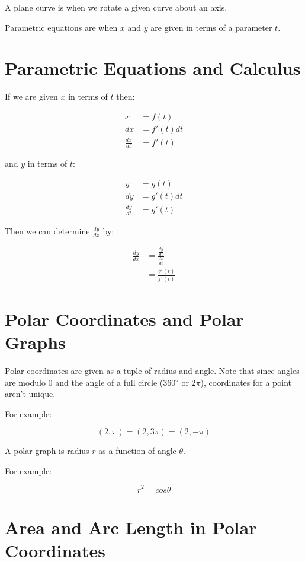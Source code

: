 \documentclass{article}
\begin{document}
A plane curve is when we rotate a given curve about an axis.

Parametric equations are when $x$ and $y$ are given in terms of a parameter $t$.

\section{Parametric Equations and Calculus}

If we are given $x$ in terms of $t$ then:

\begin{align*}
  x &= f(t) \\
  dx &= f'(t)dt \\
  \frac{dx}{dt} &= f'(t)
\end{align*}

and $y$ in terms of $t$:

\begin{align*}
  y &= g(t) \\
  dy &= g'(t)dt \\
  \frac{dy}{dt} &= g'(t)
\end{align*}

Then we can determine $\frac{dy}{dx}$ by:

\begin{align*}
  \frac{dy}{dx} &= \frac{ \frac{dy}{dt} }{ \frac{dx}{dt} } \\
  &= \frac{g'(t)}{f'(t)}
\end{align*}

\section{Polar Coordinates and Polar Graphs}

Polar coordinates are given as a tuple of radius and angle.  Note that
since angles are modulo 0 and the angle of a full circle ($360^o$ or
$2\pi$), coordinates for a point aren't unique.

For example:

\[
(2,\pi) = (2,3\pi) = (2,-\pi)
\]

A polar graph is radius $r$ as a function of angle $\theta$.

For example:

\[
r^2 = cos \theta
\]

\section{Area and Arc Length in Polar Coordinates}
\end{document}
